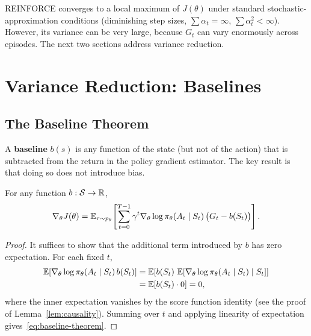 \begin{remark}
REINFORCE converges to a local maximum of $J(\theta)$ under standard stochastic-approximation conditions (diminishing step sizes, $\sum \alpha_t = \infty$, $\sum \alpha_t^2 < \infty$).  However, its variance can be very large, because $G_t$ can vary enormously across episodes.  The next two sections address variance reduction.
\end{remark}

\section{Variance Reduction: Baselines}
\label{sec:baselines}


\subsection{The Baseline Theorem}

A \textbf{baseline} $b(s)$ is any function of the state (but not of the action) that is subtracted from the return in the policy gradient estimator.  The key result is that doing so does not introduce bias.

\begin{theorem}
\label{thm:baseline}
For any function $b : \mathcal{S} \to \mathbb{R}$,
\begin{equation}
\label{eq:baseline-theorem}
\nabla_\theta J(\theta)
= \operatorname{\mathbb{E}}_{\tau \sim p_\theta}\!\left[\sum_{t=0}^{T-1} \gamma^t \nabla_\theta \log \pi_\theta(A_t \mid S_t)\, \bigl(G_t - b(S_t)\bigr)\right].
\end{equation}
\end{theorem}

\begin{proof}
It suffices to show that the additional term introduced by $b$ has zero expectation.  For each fixed $t$,
\begin{align*}
\operatorname{\mathbb{E}}\!\left[\nabla_\theta \log \pi_\theta(A_t \mid S_t)\, b(S_t)\right]
&= \operatorname{\mathbb{E}}\!\left[b(S_t)\, \operatorname{\mathbb{E}}\!\left[\nabla_\theta \log \pi_\theta(A_t \mid S_t) \mid S_t\right]\right] \\
&= \operatorname{\mathbb{E}}\!\left[b(S_t) \cdot 0\right] = 0,
\end{align*}
where the inner expectation vanishes by the score function identity (see the proof of Lemma~\ref{lem:causality}).  Summing over $t$ and applying linearity of expectation gives~\eqref{eq:baseline-theorem}.
\end{proof}


